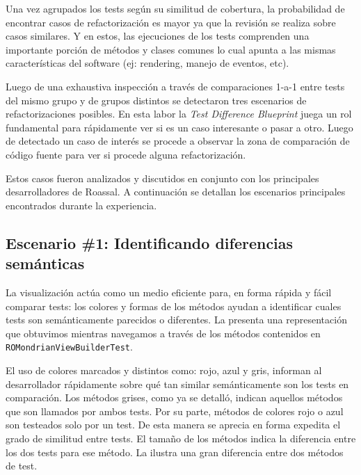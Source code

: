 \par Una vez agrupados los tests según su similitud de cobertura, la probabilidad de encontrar casos de refactorización es mayor ya que la revisión se realiza sobre casos similares. Y en estos, las ejecuciones de los tests comprenden una importante porción de métodos y clases comunes lo cual apunta a las mismas características del software (ej: rendering, manejo de eventos, etc). 

\par Luego de una exhaustiva inspección a través de comparaciones 1-a-1 entre tests del mismo grupo y de grupos distintos se detectaron tres escenarios de refactorizaciones posibles. En esta labor la \emph{Test Difference Blueprint} juega un rol fundamental para rápidamente ver si es un caso interesante o pasar a otro. Luego de detectado un caso de interés se procede  a observar la zona de comparación de código fuente para ver si procede alguna refactorización.

\par Estos casos fueron analizados y discutidos en conjunto con los principales desarrolladores de Roassal. A continuación se detallan los escenarios principales encontrados durante la experiencia.

\newpage
\subsection{Escenario \#1: Identificando diferencias semánticas}

\par La visualización actúa como un medio eficiente para, en forma rápida y fácil comparar tests: los colores y formas de los métodos ayudan a identificar cuales tests son semánticamente parecidos o diferentes.
La  presenta una representación que obtuvimos mientras navegamos a través de los métodos contenidos en {\tt ROMondrianViewBuilderTest}. 

\par El uso de colores marcados y distintos como: rojo, azul y gris, informan al desarrollador rápidamente sobre qué tan similar semánticamente son los tests en comparación. Los métodos grises, como ya se detalló, indican aquellos métodos que son llamados por ambos tests. Por su parte, métodos de colores rojo o azul son testeados solo por un test. De esta manera se aprecia en forma expedita el grado de similitud entre tests. El tamaño de los métodos indica la diferencia entre los dos tests para ese método. La  ilustra una gran diferencia entre dos métodos de test.

